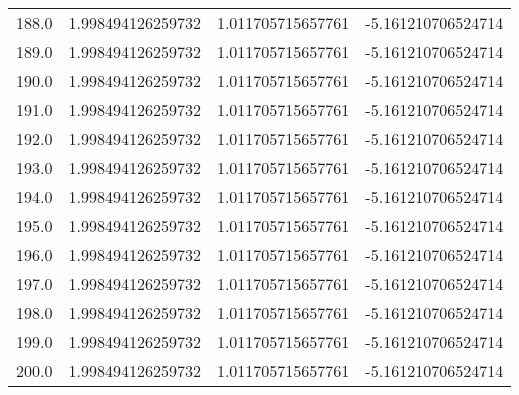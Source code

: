 \begin{longtable}{lrrr}
188.0 & 1.998494126259732 & 1.011705715657761 & -5.161210706524714 \\
189.0 & 1.998494126259732 & 1.011705715657761 & -5.161210706524714 \\
190.0 & 1.998494126259732 & 1.011705715657761 & -5.161210706524714 \\
191.0 & 1.998494126259732 & 1.011705715657761 & -5.161210706524714 \\
192.0 & 1.998494126259732 & 1.011705715657761 & -5.161210706524714 \\
193.0 & 1.998494126259732 & 1.011705715657761 & -5.161210706524714 \\
194.0 & 1.998494126259732 & 1.011705715657761 & -5.161210706524714 \\
195.0 & 1.998494126259732 & 1.011705715657761 & -5.161210706524714 \\
196.0 & 1.998494126259732 & 1.011705715657761 & -5.161210706524714 \\
197.0 & 1.998494126259732 & 1.011705715657761 & -5.161210706524714 \\
198.0 & 1.998494126259732 & 1.011705715657761 & -5.161210706524714 \\
199.0 & 1.998494126259732 & 1.011705715657761 & -5.161210706524714 \\
200.0 & 1.998494126259732 & 1.011705715657761 & -5.161210706524714 \\
\end{longtable}